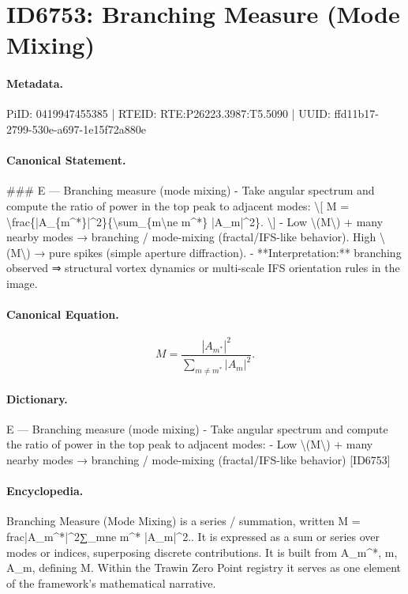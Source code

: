 \section*{ID6753: Branching Measure (Mode Mixing)}
\paragraph{Metadata.}
PiID: 0419947455385 | RTEID: RTE:P26223.3987:T5.5090 | UUID: ffd11b17-2799-530e-a697-1e15f72a880e

\paragraph{Canonical Statement.}
\#\#\# E — Branching measure (mode mixing) - Take angular spectrum and compute the ratio of power in the top peak to adjacent modes: \textbackslash{}[ M = \textbackslash{}frac\{|A\_\{m\textasciicircum{}*\}|\textasciicircum{}2\}\{\textbackslash{}sum\_\{m\textbackslash{}ne m\textasciicircum{}*\} |A\_m|\textasciicircum{}2\}. \textbackslash{}] - Low \textbackslash{}(M\textbackslash{}) + many nearby modes → branching / mode-mixing (fractal/IFS-like behavior). High \textbackslash{}(M\textbackslash{}) → pure spikes (simple aperture diffraction). - **Interpretation:** branching observed ⇒ structural vortex dynamics or multi-scale IFS orientation rules in the image.

\paragraph{Canonical Equation.}
\[
M = \frac{|A_{m^*}|^2}{\sum_{m\ne m^*} |A_m|^2}.
\]

\paragraph{Dictionary.}
E — Branching measure (mode mixing) - Take angular spectrum and compute the ratio of power in the top peak to adjacent modes: - Low \textbackslash{}(M\textbackslash{}) + many nearby modes → branching / mode-mixing (fractal/IFS-like behavior) [ID6753]

\paragraph{Encyclopedia.}
Branching Measure (Mode Mixing) is a series / summation, written M = frac|A\_m\textasciicircum{}*|\textasciicircum{}2∑\_mne m\textasciicircum{}* |A\_m|\textasciicircum{}2.. It is expressed as a sum or series over modes or indices, superposing discrete contributions. It is built from A\_m\textasciicircum{}*, m, A\_m, defining M. Within the Trawin Zero Point registry it serves as one element of the framework's mathematical narrative.
